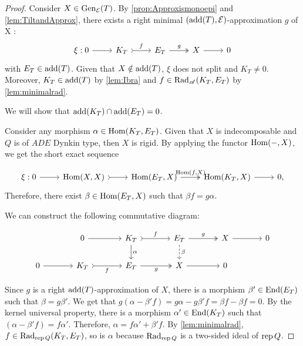 \begin{proof}
Consider $X \in \operatorname{Gen}_\mathcal{E}(T)$. By \cref{prop:Approxismonoepi} and \cref{lem:TiltandApprox},
there exists a right minimal $(\operatorname{add}(T),\mathcal{E})$-approximation $g$ of X :
\[
\begin{tikzcd}
\xi : 0 \arrow[r] & K_T \arrow[r,tail,"f"] & E_T \arrow[r,two heads,"g"] & X \arrow[r] & 0
\end{tikzcd}
\]
with $E_T\in\operatorname{add}(T)$. Given that $X \notin \operatorname{add}(T)$, $\xi$ does not split and $K_T \neq 0$. Moreover, $K_T \in \operatorname{add}(T)$ by \cref{lem:Ibra} and $f \in \operatorname{Rad}_{\mathscr{A}}(K_T,E_T)$ by \cref{lem:minimalrad}.

\smallskip

We will show that $\operatorname{add}(K_T) \cap \operatorname{add}(E_T) = 0$. 

\smallskip
Consider any morphism $\alpha \in \operatorname{Hom}(K_T,E_T)$. Given that $X$ is indecomposable and $Q$ is of $ADE$ Dynkin type, then $X$ is rigid. By applying the functor $\operatorname{Hom}(-,X)$, we get the short exact sequence

 \[\begin{tikzcd}
	\xi : 0 & \Hom(X,X) & \Hom(E_T,X)  & \Hom(K_T,X) &  0,
	\arrow[from=1-1, to=1-2]
	\arrow[tail, from=1-2, to=1-3]
	\arrow["{\scriptstyle \Hom(f,X)}",two heads,from=1-3, to=1-4]
	\arrow[from=1-4, to=1-5]
    \end{tikzcd} \]
Therefore, there exist $\beta \in \operatorname{Hom}(E_T,X)$ such that $\beta f = g\alpha$.

\smallskip
    
We can construct the following commutative diagram:

\[
\begin{tikzcd}[column sep=large]
& 0 \arrow[r] & K_T \arrow[r, tail, "f"] \arrow["\alpha",d]
            & E_T \arrow[r, two heads, "g"] \arrow["\beta",d, dashed]
            & X   \arrow[r]
            & 0   \\
0 \arrow[r] & K_T \arrow[r, tail, "f"']
    & E_T \arrow[r, two heads, "g"']
    & X   \arrow[r]
    & 0 &
\end{tikzcd}
\]

Since $g$ is a right $\operatorname{add}(T)$-approximation of $X$, there is a morphism $\beta' \in \operatorname{End}(E_T)$ such that $\beta = g\beta'$. We get that $g(\alpha - \beta'f) = g\alpha - g\beta' f = \beta f - \beta f = 0$. By the kernel universal property, there is a morphism $\alpha' \in \operatorname{End}(K_T)$ such that $(\alpha - \beta'f) = f\alpha'$. Therefore, $\alpha = f\alpha' + \beta'f$. By \cref{lem:minimalrad}, $f \in \operatorname{Rad}_{\operatorname{rep} Q}(K_T,E_T)$, so is $\alpha$ because $\operatorname{Rad}_{\operatorname{rep} Q}$ is a two-sided ideal of $\operatorname{rep} Q$.


\end{proof}
